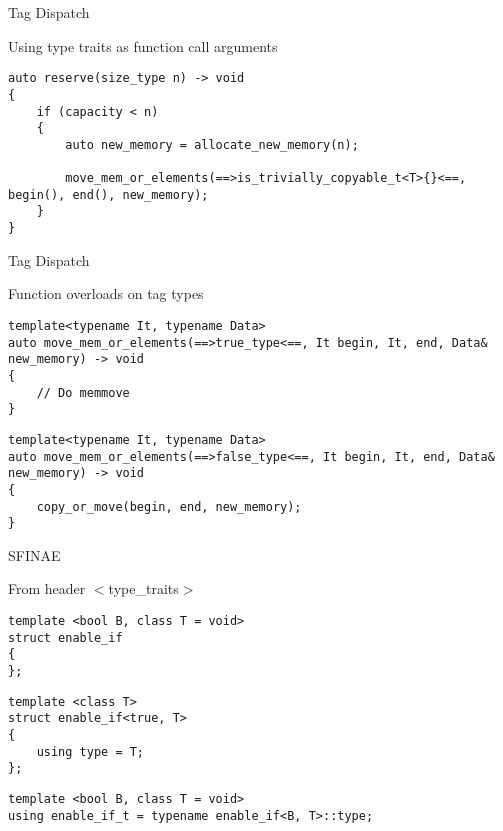 \documentclass[aspectratio=169,xcolor=dvipsnames]{beamer}
\begin{document}
\begin{frame}[fragile]{Tag Dispatch}
    \begin{block}{Using type traits as function call arguments}
        \begin{lstlisting}
auto reserve(size_type n) -> void
{
    if (capacity < n)
    {
        auto new_memory = allocate_new_memory(n);

        move_mem_or_elements(==>is_trivially_copyable_t<T>{}<==, begin(), end(), new_memory);
    }
}
        \end{lstlisting}
    \end{block}
\end{frame}

\begin{frame}[fragile]{Tag Dispatch}
    \begin{block}{Function overloads on tag types}
        \begin{lstlisting}
template<typename It, typename Data>
auto move_mem_or_elements(==>true_type<==, It begin, It, end, Data& new_memory) -> void
{
    // Do memmove
}
        \end{lstlisting}
\pause
        \begin{lstlisting}
template<typename It, typename Data>
auto move_mem_or_elements(==>false_type<==, It begin, It, end, Data& new_memory) -> void
{
    copy_or_move(begin, end, new_memory);
}
        \end{lstlisting}
    \end{block}
\end{frame}

\begin{frame}[fragile]{SFINAE}
    \pause
    \begin{block}{From header $<$type\_traits$>$}
        \begin{lstlisting}
template <bool B, class T = void>
struct enable_if
{
};
        \end{lstlisting}
\pause
        \begin{lstlisting}
template <class T>
struct enable_if<true, T>
{
    using type = T;
};
        \end{lstlisting}
\pause
        \begin{lstlisting}
template <bool B, class T = void>
using enable_if_t = typename enable_if<B, T>::type;
        \end{lstlisting}
    \end{block}
\end{frame}
\end{document}
